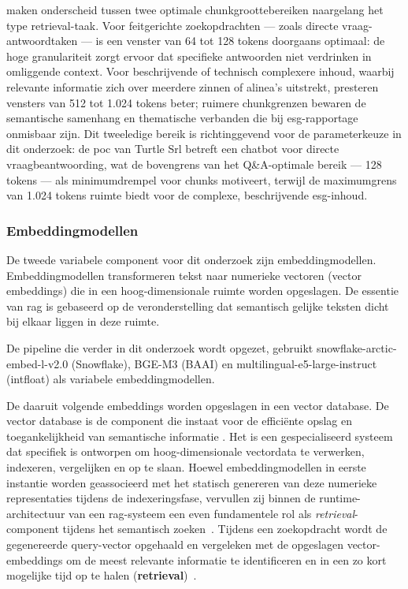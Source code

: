 \textcite{BhatEtAl2025} maken onderscheid tussen twee optimale chunkgroottebereiken naargelang het type retrieval-taak. Voor feitgerichte zoekopdrachten — zoals directe vraag-antwoordtaken — is een venster van 64 tot 128 tokens doorgaans optimaal: de hoge granulariteit zorgt ervoor dat specifieke antwoorden niet verdrinken in omliggende context. Voor beschrijvende of technisch complexere inhoud, waarbij relevante informatie zich over meerdere zinnen of alinea's uitstrekt, presteren vensters van 512 tot 1.024 tokens beter; ruimere chunkgrenzen bewaren de semantische samenhang en thematische verbanden die bij \gls{esg}-rapportage onmisbaar zijn. Dit tweeledige bereik is richtinggevend voor de parameterkeuze in dit onderzoek: de \gls{poc} van Turtle Srl betreft een chatbot voor directe vraagbeantwoording, wat de bovengrens van het Q\&A-optimale bereik — 128 tokens — als minimumdrempel voor chunks motiveert, terwijl de maximumgrens van 1.024 tokens ruimte biedt voor de complexe, beschrijvende \gls{esg}-inhoud.

\subsubsection{Embeddingmodellen}

De tweede variabele component voor dit onderzoek zijn embeddingmodellen. Embeddingmodellen transformeren tekst naar numerieke vectoren (vector embeddings) die in een hoog-dimensionale ruimte worden opgeslagen. De essentie van \gls{rag} is gebaseerd op de veronderstelling dat semantisch gelijke teksten dicht bij elkaar liggen in deze ruimte.

De pipeline die verder in dit onderzoek wordt opgezet, gebruikt snowflake-arctic-embed-l-v2.0 (Snowflake), BGE-M3 (BAAI) en multilingual-e5-large-instruct (intfloat) als variabele embeddingmodellen.

De daaruit volgende embeddings worden opgeslagen in een vector database. De vector database is de component die instaat voor de efficiënte opslag en toegankelijkheid van semantische informatie \autocite{Pawlik2025}. Het is een gespecialiseerd systeem dat specifiek is ontworpen om hoog-dimensionale vectordata te verwerken, indexeren, vergelijken en op te slaan. Hoewel embeddingmodellen in eerste instantie worden geassocieerd met het statisch genereren van deze numerieke representaties tijdens de indexeringsfase, vervullen zij binnen de runtime-architectuur van een \gls{rag}-systeem een even fundamentele rol als \textit{retrieval}-component tijdens het semantisch zoeken~\autocite{Moreira2024,ReimersGurevych2019}. Tijdens een zoekopdracht wordt de gegenereerde query-vector opgehaald en vergeleken met de opgeslagen vector-embeddings om de meest relevante informatie te identificeren en in een zo kort mogelijke tijd op te halen (\textbf{retrieval})~\autocite{Rahul2024}.


